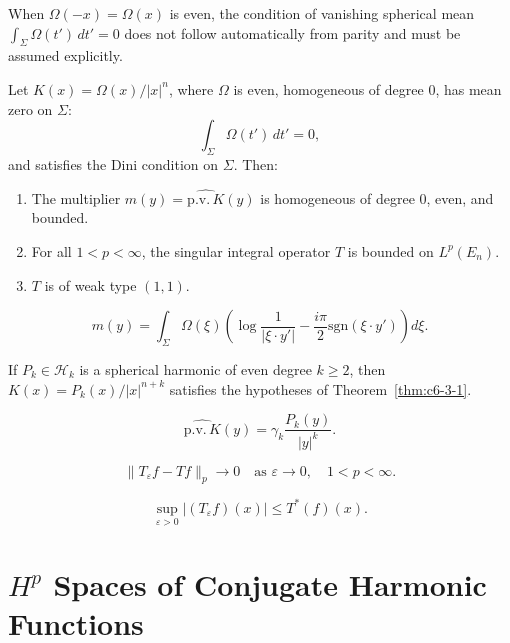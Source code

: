 When $\Omega(-x) = \Omega(x)$ is even, the condition of vanishing spherical mean $\int_\Sigma \Omega(t')\,dt' = 0$ does not follow automatically from parity and must be assumed explicitly.

\begin{theorem}\label{thm:c6-3-1}
Let $K(x) = \Omega(x)/|x|^n$, where $\Omega$ is even, homogeneous of degree $0$, has mean zero on $\Sigma$:
\begin{equation}\label{eq:c6-3-2}
\int_\Sigma \Omega(t')\,dt' = 0,
\end{equation}
and satisfies the Dini condition on $\Sigma$. Then:
\begin{enumerate}
\item[(a)] The multiplier $m(y) = \widehat{\text{p.v.}\,K}(y)$ is homogeneous of degree $0$, even, and bounded.
\item[(b)] For all $1 < p < \infty$, the singular integral operator $T$ is bounded on $L^p(E_n)$.
\item[(c)] $T$ is of weak type $(1, 1)$.
\end{enumerate}
\end{theorem}

\begin{equation}\label{eq:c6-3-3}
m(y) = \int_\Sigma \Omega(\xi) \left( \log \frac{1}{|\xi \cdot y'|} - \frac{i\pi}{2} \text{sgn}(\xi \cdot y') \right) d\xi.
\end{equation}

\begin{lemma}\label{lem:c6-3-4}
If $P_k \in \mathcal{H}_k$ is a spherical harmonic of even degree $k \geq 2$, then $K(x) = P_k(x)/|x|^{n+k}$ satisfies the hypotheses of Theorem~\ref{thm:c6-3-1}.
\end{lemma}

\begin{equation}\label{eq:c6-3-5}
\widehat{\text{p.v.}\,K}(y) = \gamma_k \frac{P_k(y)}{|y|^k}.
\end{equation}

\begin{equation}\label{eq:c6-3-6}
\|T_\varepsilon f - Tf\|_p \to 0 \quad \text{as } \varepsilon \to 0, \quad 1 < p < \infty.
\end{equation}

\begin{equation}\label{eq:c6-3-7}
\sup_{\varepsilon > 0} |(T_\varepsilon f)(x)| \leq T^*(f)(x).
\end{equation}

\section{\texorpdfstring{$H^p$}{Hp} Spaces of Conjugate Harmonic Functions}

